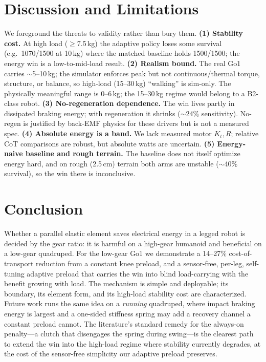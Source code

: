 \documentclass[journal]{IEEEtran}
\begin{document}
\section{Discussion and Limitations}
We foreground the threats to validity rather than bury them.
\textbf{(1) Stability cost.} At high load ($\geq$7.5\,kg) the adaptive policy loses some survival (e.g.\ 1070/1500
at 10\,kg) where the matched baseline holds 1500/1500; the energy win is a low-to-mid-load result.
\textbf{(2) Realism bound.} The real Go1 carries $\sim$5--10\,kg; the simulator enforces peak but not
continuous/thermal torque, structure, or balance, so high-load (15--30\,kg) ``walking'' is sim-only. The
physically meaningful range is 0--6\,kg; the 15--30\,kg regime would belong to a B2-class robot.
\textbf{(3) No-regeneration dependence.} The win lives partly in dissipated braking energy; with regeneration it
shrinks ($\sim$24\% sensitivity). No-regen is justified by back-EMF physics for these drivers but is not a
measured spec.
\textbf{(4) Absolute energy is a band.} We lack measured motor $K_t,R$; relative CoT comparisons are robust, but
absolute watts are uncertain.
\textbf{(5) Energy-naive baseline and rough terrain.} The baseline does not itself optimize energy hard, and on
rough (2.5\,cm) terrain both arms are unstable ($\sim$40\% survival), so the win there is inconclusive.

\section{Conclusion}
Whether a parallel elastic element saves electrical energy in a legged robot is decided by the gear ratio: it is
harmful on a high-gear humanoid and beneficial on a low-gear quadruped. For the low-gear Go1 we demonstrate a
14--27\% cost-of-transport reduction from a constant knee preload, and a sensor-free, per-leg, self-tuning
adaptive preload that carries the win into blind load-carrying with the benefit growing with load. The mechanism
is simple and deployable; its boundary, its element form, and its high-load stability cost are characterized.
Future work runs the same idea on a \emph{running} quadruped, where impact braking energy is largest and a
one-sided stiffness spring may add a recovery channel a constant preload cannot. The literature's standard
remedy for the always-on penalty---a clutch that disengages the spring during swing---is the clearest path to
extend the win into the high-load regime where stability currently degrades, at the cost of the sensor-free
simplicity our adaptive preload preserves.
\end{document}
